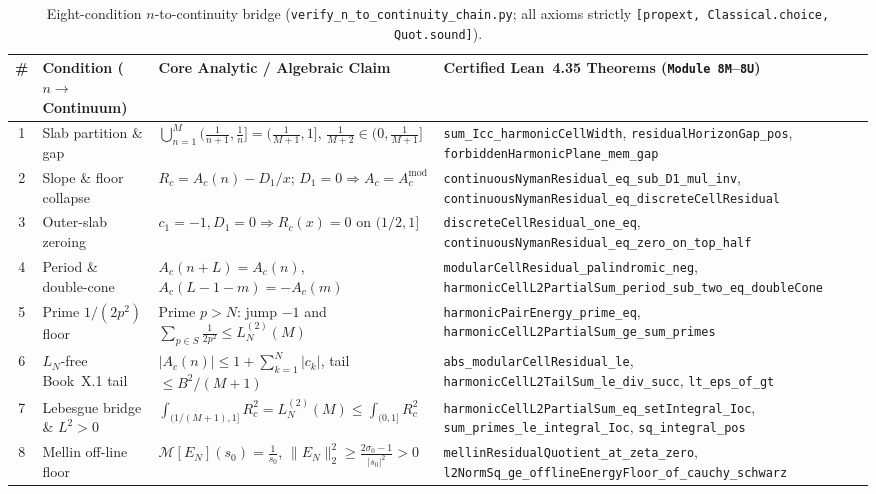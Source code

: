 \documentclass[10pt,a4paper]{article}
\theoremstyle{definition}
\begin{document}
\begin{table}[ht]
\centering
\scriptsize
\setlength{\tabcolsep}{3.2pt}
\begin{tabular}{@{}cl>{\raggedright\arraybackslash}p{4.3cm}>{\raggedright\arraybackslash}p{7.3cm}@{}}
\toprule
\# & Condition ($n \to$ Continuum) & Core Analytic / Algebraic Claim & Certified Lean~4.35 Theorems (\texttt{Module~8M}--\texttt{8U}) \\
\midrule
1 & Slab partition \& gap & $\bigcup_{n=1}^M \bigl(\tfrac{1}{n+1},\tfrac{1}{n}\bigr] = \bigl(\tfrac{1}{M+1},1\bigr]$, $\frac{1}{M+2} \in (0,\tfrac{1}{M+1}]$ & \texttt{sum\_Icc\_\allowbreak harmonicCellWidth}, \texttt{residualHorizonGap\_\allowbreak pos}, \texttt{forbiddenHarmonicPlane\_\allowbreak mem\_gap} \\
2 & Slope \& floor collapse & $R_c = A_c(n) - D_1/x$; $D_1 = 0 \Rightarrow A_c = A_c^{\mathrm{mod}}$ & \texttt{continuousNymanResidual\_\allowbreak eq\_sub\_D1\_\allowbreak mul\_inv}, \texttt{continuousNymanResidual\_\allowbreak eq\_discreteCellResidual} \\
3 & Outer-slab zeroing & $c_1 = -1, D_1 = 0 \Rightarrow R_c(x) = 0$ on $(1/2, 1]$ & \texttt{discreteCellResidual\_one\_eq}, \texttt{continuousNymanResidual\_\allowbreak eq\_zero\_on\_top\_half} \\
4 & Period \& double-cone & $A_c(n+L) = A_c(n)$, $A_c(L-1-m) = -A_c(m)$ & \texttt{modularCellResidual\_\allowbreak palindromic\_neg}, \texttt{harmonicCellL2PartialSum\_\allowbreak period\_sub\_two\_\allowbreak eq\_doubleCone} \\
5 & Prime $1/(2p^2)$ floor & Prime $p > N$: jump $-1$ and $\sum_{p \in S}\frac{1}{2p^2} \le L_N^{(2)}(M)$ & \texttt{harmonicPairEnergy\_\allowbreak prime\_eq}, \texttt{harmonicCellL2PartialSum\_\allowbreak ge\_sum\_primes} \\
6 & $L_N$-free Book~X.1 tail & $|A_c(n)| \le 1 + \sum_{k=1}^N |c_k|$, tail $\le B^2/(M+1)$ & \texttt{abs\_modularCellResidual\_\allowbreak le}, \texttt{harmonicCellL2TailSum\_\allowbreak le\_div\_succ}, \texttt{lt\_eps\_of\_gt} \\
7 & Lebesgue bridge \& $L^2 > 0$ & $\int_{(1/(M+1),1]} R_c^2 = L_N^{(2)}(M) \le \int_{(0,1]} R_c^2$ & \texttt{harmonicCellL2PartialSum\_\allowbreak eq\_setIntegral\_Ioc}, \texttt{sum\_primes\_le\_\allowbreak integral\_Ioc}, \texttt{sq\_integral\_pos} \\
8 & Mellin off-line floor & $\mathcal{M}[E_N](s_0) = \frac{1}{s_0}$, $\|E_N\|_2^2 \ge \frac{2\sigma_0 - 1}{|s_0|^2} > 0$ & \texttt{mellinResidualQuotient\_\allowbreak at\_zeta\_zero}, \texttt{l2NormSq\_ge\_\allowbreak offlineEnergyFloor\_\allowbreak of\_cauchy\_schwarz} \\
\bottomrule
\end{tabular}
\caption{Eight-condition $n$-to-continuity bridge (\texttt{verify\_\allowbreak n\_\allowbreak to\_\allowbreak continuity\_\allowbreak chain.py}; all axioms strictly \texttt{[propext, Classical.choice, Quot.sound]}).}
\label{tab:eight_condition_continuity}
\end{table}
\end{document}
